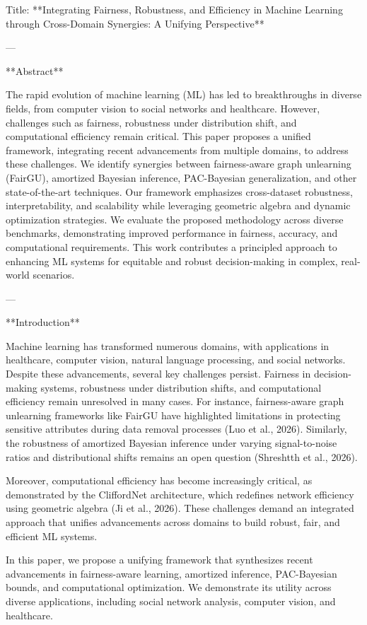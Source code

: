 Title: **Integrating Fairness, Robustness, and Efficiency in Machine Learning through Cross-Domain Synergies: A Unifying Perspective**

---

**Abstract**

The rapid evolution of machine learning (ML) has led to breakthroughs in diverse fields, from computer vision to social networks and healthcare. However, challenges such as fairness, robustness under distribution shift, and computational efficiency remain critical. This paper proposes a unified framework, integrating recent advancements from multiple domains, to address these challenges. We identify synergies between fairness-aware graph unlearning (FairGU), amortized Bayesian inference, PAC-Bayesian generalization, and other state-of-the-art techniques. Our framework emphasizes cross-dataset robustness, interpretability, and scalability while leveraging geometric algebra and dynamic optimization strategies. We evaluate the proposed methodology across diverse benchmarks, demonstrating improved performance in fairness, accuracy, and computational requirements. This work contributes a principled approach to enhancing ML systems for equitable and robust decision-making in complex, real-world scenarios.

---

**Introduction**

Machine learning has transformed numerous domains, with applications in healthcare, computer vision, natural language processing, and social networks. Despite these advancements, several key challenges persist. Fairness in decision-making systems, robustness under distribution shifts, and computational efficiency remain unresolved in many cases. For instance, fairness-aware graph unlearning frameworks like FairGU have highlighted limitations in protecting sensitive attributes during data removal processes (Luo et al., 2026). Similarly, the robustness of amortized Bayesian inference under varying signal-to-noise ratios and distributional shifts remains an open question (Shreshtth et al., 2026).

Moreover, computational efficiency has become increasingly critical, as demonstrated by the CliffordNet architecture, which redefines network efficiency using geometric algebra (Ji et al., 2026). These challenges demand an integrated approach that unifies advancements across domains to build robust, fair, and efficient ML systems.

In this paper, we propose a unifying framework that synthesizes recent advancements in fairness-aware learning, amortized inference, PAC-Bayesian bounds, and computational optimization. We demonstrate its utility across diverse applications, including social network analysis, computer vision, and healthcare.

